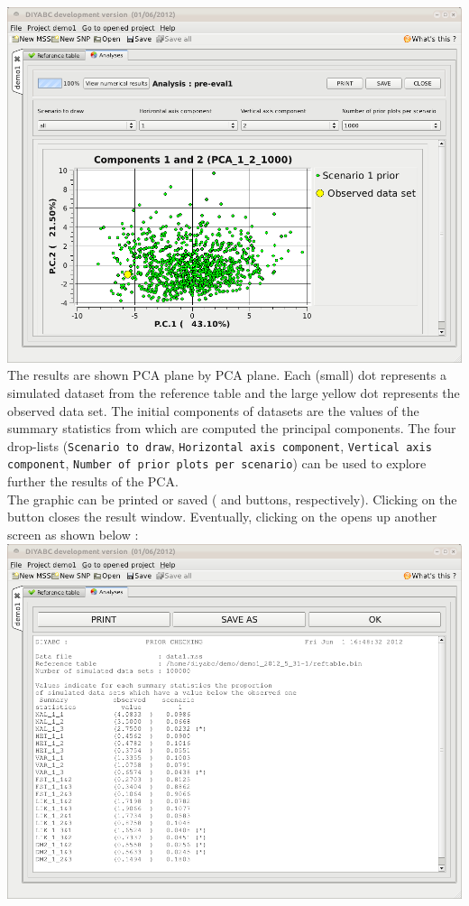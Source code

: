 \includegraphics[scale=0.35]{gui_pictures/Capture-DIYABC-32} \\


The results are shown PCA plane by PCA plane. Each (small) dot represents
a simulated dataset from the reference table and the large yellow
dot represents the observed data set. The initial components of datasets
are the values of the summary statistics from which are computed the
principal components. The four drop-lists (\texttt{Scenario to draw},
\texttt{Horizontal axis component}, \texttt{Vertical axis component},
\texttt{Number of prior plots per scenario}) can be used to explore
further the results of the PCA.\\
 The graphic can be printed or saved ( and
 buttons, respectively). Clicking on the 
button closes the result window. Eventually, clicking on the  opens up another screen as shown below :\\


\includegraphics[scale=0.35]{gui_pictures/Capture-DIYABC-33} \\


